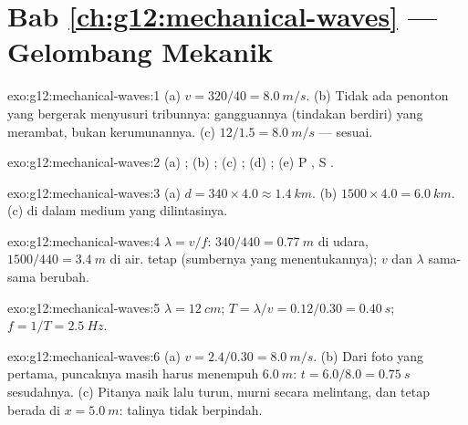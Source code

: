 \section*{Bab \ref{ch:g12:mechanical-waves} --- Gelombang Mekanik}

\begin{solution}{exo:g12:mechanical-waves:1}
(a) $v = 320/40 = \qty{8.0}{m/s}$. (b) Tidak ada penonton yang bergerak
menyusuri tribunnya: gangguannya (tindakan berdiri) yang merambat, bukan
kerumunannya. (c) $12/1.5 = \qty{8.0}{m/s}$ --- sesuai.
\end{solution}

\begin{solution}{exo:g12:mechanical-waves:2}
(a) ; (b) ; (c) ; (d) ;
(e) P , S .
\end{solution}

\begin{solution}{exo:g12:mechanical-waves:3}
(a) $d = 340 \times 4.0 \approx \qty{1.4}{km}$.
(b) $1500 \times 4.0 = \qty{6.0}{km}$. (c)  di dalam
medium yang dilintasinya.
\end{solution}

\begin{solution}{exo:g12:mechanical-waves:4}
$\lambda = v/f$: $340/440 = \qty{0.77}{m}$ di udara,
$1500/440 = \qty{3.4}{m}$ di air.  tetap (sumbernya yang
menentukannya); $v$ dan $\lambda$ sama-sama berubah.
\end{solution}

\begin{solution}{exo:g12:mechanical-waves:5}
$\lambda = \qty{12}{cm}$; $T = \lambda/v = 0.12/0.30 = \qty{0.40}{s}$;
$f = 1/T = \qty{2.5}{Hz}$.
\end{solution}

\begin{solution}{exo:g12:mechanical-waves:6}
(a) $v = 2.4/0.30 = \qty{8.0}{m/s}$. (b) Dari foto yang pertama,
puncaknya masih harus menempuh $\qty{6.0}{m}$:
$t = 6.0/8.0 = \qty{0.75}{s}$ sesudahnya. (c) Pitanya naik lalu turun,
murni secara melintang, dan tetap berada di $x = \qty{5.0}{m}$: talinya
tidak berpindah.
\end{solution}

